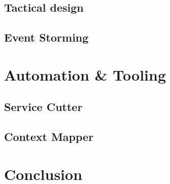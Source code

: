 \documentclass[letterpaper,12pt,leqno]{article}
\newcommand{\bib}{bibliography.bib}
\begin{document}
\subsection{Tactical design}

\subsection{Event Storming}\label{s:event-storming}

\section{Automation & Tooling}\label{s:automation}

\subsection{Service Cutter}\label{s:B}
\subsection{Context Mapper}\label{s:A}

\section{Conclusion}\label{s:conclusion}



\appendix

\listoffigures
\end{document}
